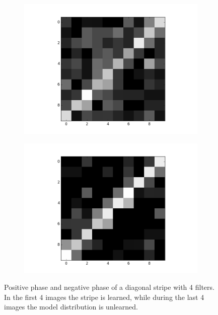 \begin{figure}[h!]
\begin{subfigure}{.25\textwidth}
  		\includegraphics[width=\linewidth]{imgs/reconst/00006.png}
  		\label{fig:sub1}
	\end{subfigure}%
	\begin{subfigure}{.25\textwidth}
  		\centering
  		\includegraphics[width=\linewidth]{imgs/reconst/00008.png}
  		\label{fig:sub1}
	\end{subfigure}%
	\caption{Positive phase and negative phase of a diagonal stripe with 4 filters. In the first 4 images the stripe is learned, while during the last 4 images the model distribution is unlearned.}
	\label{fig:stripes}
\end{figure}

